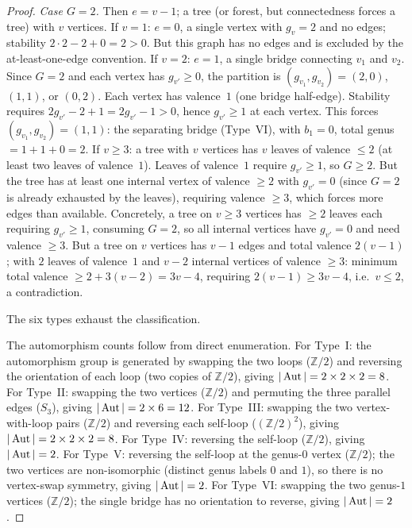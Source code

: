 \begin{proof}
\emph{Case $G = 2$.} Then $e = v - 1$; a tree (or forest,
but connectedness forces a tree) with $v$ vertices.
If $v = 1$: $e = 0$, a single vertex with $g_v = 2$ and no
edges; stability $2 \cdot 2 - 2 + 0 = 2 > 0$. But this
graph has no edges and is excluded by the at-least-one-edge
convention.
If $v = 2$: $e = 1$, a single bridge connecting $v_1$ and $v_2$.
Since $G = 2$ and each vertex has $g_{v'} \geq 0$, the
partition is $(g_{v_1}, g_{v_2}) = (2,0)$, $(1,1)$, or $(0,2)$.
Each vertex has valence~$1$ (one bridge half-edge).
Stability requires $2g_{v'} - 2 + 1 = 2g_{v'} - 1 > 0$, hence
$g_{v'} \geq 1$ at each vertex. This forces
$(g_{v_1}, g_{v_2}) = (1,1)$: the separating bridge (Type~VI),
with $b_1 = 0$, total genus $= 1 + 1 + 0 = 2$.
If $v \geq 3$: a tree with $v$ vertices has $v$ leaves of
valence $\leq 2$ (at least two leaves of valence~$1$).
Leaves of valence~$1$ require $g_{v'} \geq 1$, so $G \geq 2$.
But the tree has at least one internal vertex of
valence $\geq 2$ with $g_{v'} = 0$ (since $G = 2$ is already
exhausted by the leaves), requiring
valence $\geq 3$, which forces more edges than available.
Concretely, a tree on $v \geq 3$ vertices has $\geq 2$ leaves
each requiring $g_{v'} \geq 1$, consuming $G = 2$, so all
internal vertices have $g_{v'} = 0$ and need
valence $\geq 3$. But a tree on $v$ vertices has $v - 1$
edges and total valence $2(v-1)$; with $2$ leaves of
valence~$1$ and $v - 2$ internal vertices of valence $\geq 3$:
minimum total valence $\geq 2 + 3(v-2) = 3v - 4$, requiring
$2(v-1) \geq 3v - 4$, i.e.\ $v \leq 2$, a contradiction.

The six types exhaust the classification.

The automorphism counts follow from direct enumeration. For
Type~I: the automorphism group is generated by swapping the two
loops ($\mathbb{Z}/2$) and reversing the orientation of each
loop (two copies of $\mathbb{Z}/2$), giving
$|\operatorname{Aut}| = 2 \times 2 \times 2 = 8$. For Type~II: swapping the
two vertices ($\mathbb{Z}/2$) and permuting the three parallel
edges ($S_3$), giving $|\operatorname{Aut}| = 2 \times 6 = 12$. For
Type~III: swapping the two vertex-with-loop pairs
($\mathbb{Z}/2$) and reversing each self-loop
($(\mathbb{Z}/2)^2$), giving
$|\operatorname{Aut}| = 2 \times 2 \times 2 = 8$. For Type~IV: reversing
the self-loop ($\mathbb{Z}/2$), giving $|\operatorname{Aut}| = 2$.
For Type~V: reversing the self-loop at the genus-$0$ vertex
($\mathbb{Z}/2$); the two vertices are non-isomorphic
(distinct genus labels $0$ and $1$), so there is no
vertex-swap symmetry, giving $|\operatorname{Aut}| = 2$.
For Type~VI: swapping the two genus-$1$ vertices
($\mathbb{Z}/2$); the single bridge has no orientation to
reverse, giving $|\operatorname{Aut}| = 2$.
\end{proof}

